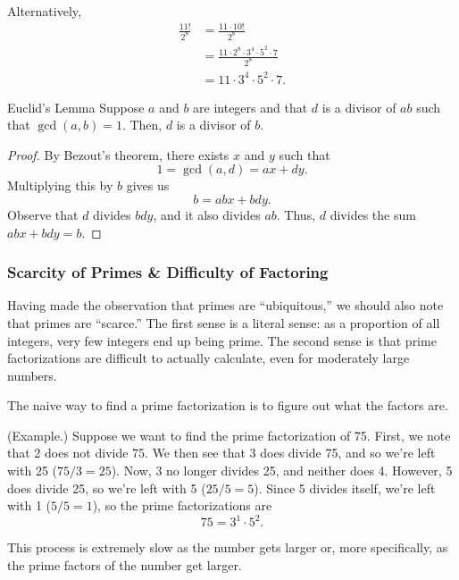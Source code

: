 \documentclass[letterpaper]{article}
\begin{document}
\begin{mdframed}
\begin{enumerate}
\begin{mdframed}
            Alternatively, 
            \begin{equation*}
                \begin{aligned}
                    \frac{11!}{2^8} &= \frac{11 \cdot 10!}{2^8} \\
                        &= \frac{11 \cdot 2^8 \cdot 3^4 \cdot 5^2 \cdot 7}{2^8} \\ 
                        &= 11 \cdot 3^4 \cdot 5^2 \cdot 7.
                \end{aligned}
            \end{equation*}
        \end{mdframed}
    \end{enumerate}
\end{mdframed}

\begin{lemma}{Euclid's Lemma}{}
    Suppose $a$ and $b$ are integers and that $d$ is a divisor of $ab$ such that $\gcd(a, b) = 1$. Then, $d$ is a divisor of $b$. 
\end{lemma}

\begin{proof}
    By Bezout's theorem, there exists $x$ and $y$ such that \[1 = \gcd(a, d) = ax + dy.\] Multiplying this by $b$ gives us \[b = abx + bdy.\] Observe that $d$ divides $bdy$, and it also divides $ab$. Thus, $d$ divides the sum $abx + bdy = b$. 
\end{proof}

\subsubsection{Scarcity of Primes \& Difficulty of Factoring}
Having made the observation that primes are ``ubiquitous,'' we should also note that primes are ``scarce.'' The first sense is a literal sense: as a proportion of all integers, very few integers end up being prime. The second sense is that prime factorizations are difficult to actually calculate, even for moderately large numbers. 

\bigskip 

The naive way to find a prime factorization is to figure out what the factors are.
\begin{mdframed}
    (Example.) Suppose we want to find the prime factorization of 75. First, we note that 2 does not divide 75. We then see that 3 does divide 75, and so we're left with 25 ($75 / 3 = 25$). Now, 3 no longer divides 25, and neither does 4. However, 5 does divide 25, so we're left with 5 ($25 / 5 = 5$). Since 5 divides itself, we're left with 1 ($5 / 5 = 1$), so the prime factorizations are \[75 = 3^1 \cdot 5^2.\]
\end{mdframed}
This process is extremely slow as the number gets larger or, more specifically, as the prime factors of the number get larger. 
\end{document}
